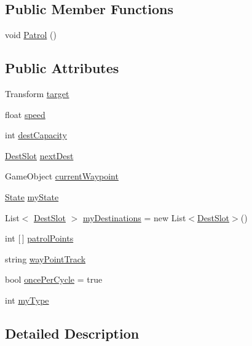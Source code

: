\subsection*{Public Member Functions}
\begin{DoxyCompactItemize}
\item 
void \hyperlink{classsim_person_aca3d90fe7d83818e4ef9b8570b353965}{Patrol} ()
\end{DoxyCompactItemize}
\subsection*{Public Attributes}
\begin{DoxyCompactItemize}
\item 
Transform \hyperlink{classsim_person_a5db445fe5749d0b0165efeb3bd7b0ba9}{target}
\item 
float \hyperlink{classsim_person_a28e2b04758c3682f50ba01eb5d1740c0}{speed}
\item 
int \hyperlink{classsim_person_ac816cec7286f37dc4f4fa30d5c5d909c}{dest\+Capacity}
\item 
\hyperlink{classsim_person_1_1_dest_slot}{Dest\+Slot} \hyperlink{classsim_person_ae3bcceb05ae974887c5f6f68951f5dcc}{next\+Dest}
\item 
Game\+Object \hyperlink{classsim_person_a47b2bb1a902576614f65b7ecf1fa1bdd}{current\+Waypoint}
\item 
\hyperlink{classsim_person_a2e742c09e6786146fe250d0066fe78e9}{State} \hyperlink{classsim_person_aae85299b3299888345288c53bf991626}{my\+State}
\item 
List$<$ \hyperlink{classsim_person_1_1_dest_slot}{Dest\+Slot} $>$ \hyperlink{classsim_person_a1459d9a83816086b302d5fb609855ed7}{my\+Destinations} = new List$<$\hyperlink{classsim_person_1_1_dest_slot}{Dest\+Slot}$>$()
\item 
int \mbox{[}$\,$\mbox{]} \hyperlink{classsim_person_aebd6a40f59fce0a78e71599b0b39bc67}{patrol\+Points}
\item 
string \hyperlink{classsim_person_af45d2902026e35903cebbe51f66caf30}{way\+Point\+Track}
\item 
bool \hyperlink{classsim_person_a21ac457e8040d80854cb5b1ab59bfd6f}{once\+Per\+Cycle} = true
\item 
int \hyperlink{classsim_person_aefacfa94adcf92832728769bb58895bc}{my\+Type}
\end{DoxyCompactItemize}


\subsection{Detailed Description}


